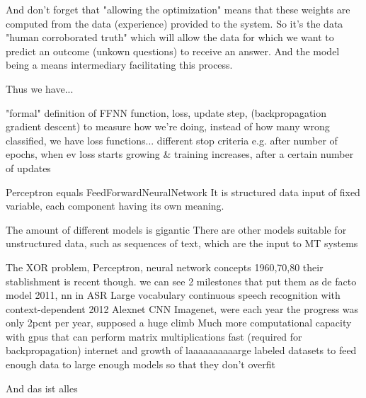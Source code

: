 \documentclass[11pt,english,listoffigures,listoftables]{tfgetsinf}
\begin{document}
And don't forget that "allowing the optimization" means that these weights are computed from the data (experience) provided to the system.
So it's the data "human corroborated truth" which will allow the data for which we want to predict an outcome (unkown questions) to receive an answer. And the model being a means intermediary facilitating this process.

Thus we have...

"formal" definition of FFNN
function, loss, update step, (backpropagation gradient descent)
to measure how we're doing, instead of how many wrong classified, we have loss functions...
different stop criteria e.g. after number of epochs, when ev loss starts growing & training increases, after a certain number of updates

Perceptron equals FeedForwardNeuralNetwork
It is structured data
input of fixed variable, each component having its own meaning. 

The amount of different models is gigantic
There are other models suitable for unstructured data, such as sequences of text, which are the input to MT systems

The XOR problem, Perceptron, neural network concepts 1960,70,80
their stablishment is recent though. we can see 2 milestones that put them as de facto model
2011, nn in ASR Large vocabulary continuous speech recognition with context-dependent
2012 Alexnet CNN Imagenet, were each year the progress was only 2pcnt per year, supposed a huge climb
Much more computational capacity with gpus that can perform matrix multiplications fast (required for backpropagation)
internet and growth of laaaaaaaaaarge labeled datasets to feed enough data to large enough models so that they don't overfit

And das ist alles


%
\end{document}
